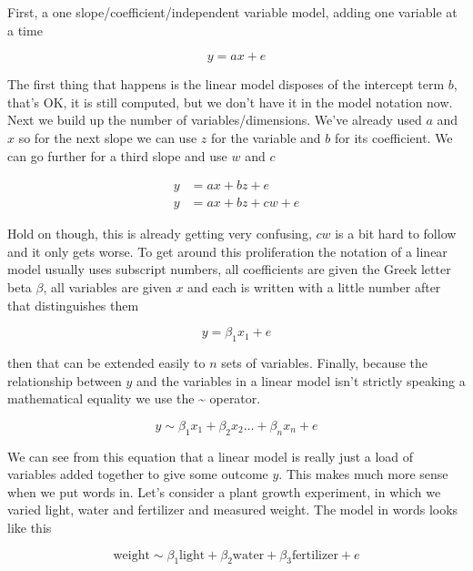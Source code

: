 \documentclass[
]{book}
\begin{document}
First, a one slope/coefficient/independent variable model, adding one variable at a time

\begin{equation}
y = ax + e
\end{equation}

The first thing that happens is the linear model disposes of the intercept term \(b\), that's OK, it is still computed, but we don't have it in the model notation now. Next we build up the number of variables/dimensions. We've already used \(a\) and \(x\) so for the next slope we can use \(z\) for the variable and \(b\) for its coefficient. We can go further for a third slope and use \(w\) and \(c\)

\begin{align*}
y &= ax + bz + e\\
y &= ax + bz + cw + e
\end{align*}

Hold on though, this is already getting very confusing, \(cw\) is a bit hard to follow and it only gets worse. To get around this proliferation the notation of a linear model usually uses subscript numbers, all coefficients are given the Greek letter beta \(\beta\), all variables are given \(x\) and each is written with a little number after that distinguishes them

\begin{equation}
y = \beta_1 x_1 + e
\end{equation}

then that can be extended easily to \(n\) sets of variables. Finally, because the relationship between \(y\) and the variables in a linear model isn't strictly speaking a mathematical equality we use the \textasciitilde{} operator.

\begin{equation}
y \sim \beta_1 x_1 + \beta_2 x_2 \dotsc + \beta_n x_n + e
\end{equation}

We can see from this equation that a linear model is really just a load of variables added together to give some outcome \(y\). This makes much more sense when we put words in. Let's consider a plant growth experiment, in which we varied light, water and fertilizer and measured weight. The model in words looks like this

\begin{equation}
\mbox{weight} \sim \beta_1 \mbox{light} + \beta_2 \mbox{water} + \beta_3 \mbox{fertilizer} + e 
\end{equation}
\end{document}
